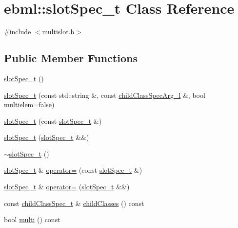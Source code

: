 \hypertarget{classebml_1_1slotSpec__t}{}\section{ebml\+:\+:slot\+Spec\+\_\+t Class Reference}
\label{classebml_1_1slotSpec__t}


{\ttfamily \#include $<$multislot.\+h$>$}

\subsection*{Public Member Functions}
\begin{DoxyCompactItemize}
\item 
\mbox{\hyperlink{classebml_1_1slotSpec__t_a28a3cf34f3ab54176feac825ec132c9e}{slot\+Spec\+\_\+t}} ()
\item 
\mbox{\hyperlink{classebml_1_1slotSpec__t_a1d4e4264361ead0bccae5b28c7ba275b}{slot\+Spec\+\_\+t}} (const std\+::string \&, const \mbox{\hyperlink{namespaceebml_abf07998998c284c9be3f76b5d9e192e1}{child\+Class\+Spec\+Arg\+\_\+l}} \&, bool multielem=false)
\item 
\mbox{\hyperlink{classebml_1_1slotSpec__t_a98310fdebfa88812dcceaec3af20fe4b}{slot\+Spec\+\_\+t}} (const \mbox{\hyperlink{classebml_1_1slotSpec__t}{slot\+Spec\+\_\+t}} \&)
\item 
\mbox{\hyperlink{classebml_1_1slotSpec__t_acb5cb8f607dae2ec56efbc700a763759}{slot\+Spec\+\_\+t}} (\mbox{\hyperlink{classebml_1_1slotSpec__t}{slot\+Spec\+\_\+t}} \&\&)
\item 
\mbox{\hyperlink{classebml_1_1slotSpec__t_a8cf105dfb5bd9d77d88e306223f62a61}{$\sim$slot\+Spec\+\_\+t}} ()
\item 
\mbox{\hyperlink{classebml_1_1slotSpec__t}{slot\+Spec\+\_\+t}} \& \mbox{\hyperlink{classebml_1_1slotSpec__t_a46053c168b61bbc61c2125d3375d4e63}{operator=}} (const \mbox{\hyperlink{classebml_1_1slotSpec__t}{slot\+Spec\+\_\+t}} \&)
\item 
\mbox{\hyperlink{classebml_1_1slotSpec__t}{slot\+Spec\+\_\+t}} \& \mbox{\hyperlink{classebml_1_1slotSpec__t_aebedb39b17caaedb754dc14854fae54a}{operator=}} (\mbox{\hyperlink{classebml_1_1slotSpec__t}{slot\+Spec\+\_\+t}} \&\&)
\item 
const \mbox{\hyperlink{classebml_1_1childClassSpec__t}{child\+Class\+Spec\+\_\+t}} \& \mbox{\hyperlink{classebml_1_1slotSpec__t_ab0b0bb9fa4174f49d4cfa0d3b756b337}{child\+Classes}} () const
\item 
bool \mbox{\hyperlink{classebml_1_1slotSpec__t_a2216622e5df326773cc2854a2b638208}{multi}} () const
\end{DoxyCompactItemize}

